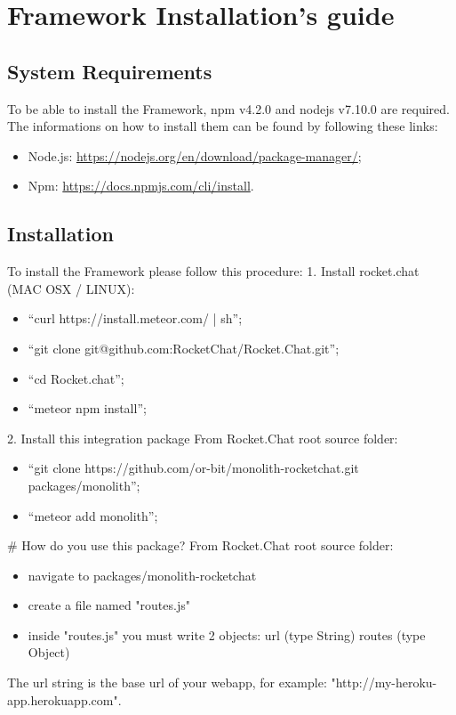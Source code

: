 \section{Framework Installation's guide}

\subsection{System Requirements}
To be able to install the Framework, npm v4.2.0 and nodejs v7.10.0 are required. The informations on how to install them can be found by following these links:
\begin{itemize}
	\item Node.js: \url{https://nodejs.org/en/download/package-manager/};
	\item Npm: \url{https://docs.npmjs.com/cli/install}.
\end{itemize}

\subsection{Installation}

To install the Framework  please follow this procedure:
1. Install rocket.chat (MAC OSX / LINUX):
\begin{itemize}
    \item ``curl https://install.meteor.com/ | sh'';
    \item ``git clone git@github.com:RocketChat/Rocket.Chat.git'';
    \item ``cd Rocket.chat'';
    \item ``meteor npm install''; 
\end{itemize}

2. Install this integration package
  From Rocket.Chat root source folder:
 \begin{itemize}
    \item ``git clone https://github.com/or-bit/monolith-rocketchat.git packages/monolith'';
    \item ``meteor add monolith'';
\end{itemize}

# How do you use this package?
From Rocket.Chat root source folder:
\begin{itemize}
\item navigate to packages/monolith-rocketchat
\item create a file named "routes.js"
\item inside "routes.js" you must write 2 objects:   url (type String)  routes (type Object)
\end{itemize}

The url string is the base url of your webapp, for example: "http://my-heroku-app.herokuapp.com".
